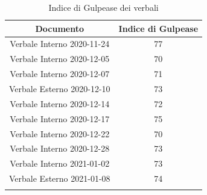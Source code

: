 \begin{center}
\begin{center}
        \begin{longtable}{|c|c|}
      
        \hline
        \rowcolor{lighter-grayer}
        \textbf{Documento} & \textbf{Indice di Gulpease} \\
       
        \hline
        \endfirsthead


        \hline


       
      

        Verbale Interno 2020-11-24 & 77 \\
        Verbale Interno 2020-12-05 & 70 \\
        Verbale Interno 2020-12-07& 71 \\
        Verbale Esterno 2020-12-10 & 73  \\
        Verbale Interno 2020-12-14 & 72 \\
        Verbale Interno 2020-12-17 & 75  \\
        Verbale Interno 2020-12-22 & 70 \\
        Verbale Interno 2020-12-28 & 73  \\
        Verbale Interno 2021-01-02& 73 \\  
        Verbale Esterno 2021-01-08 & 74  \\
        

    
        \hline
        \rowcolor{white}
        \caption{Indice di Gulpease dei verbali}
        
        \end{longtable}
    \end{center}
\end{center}


